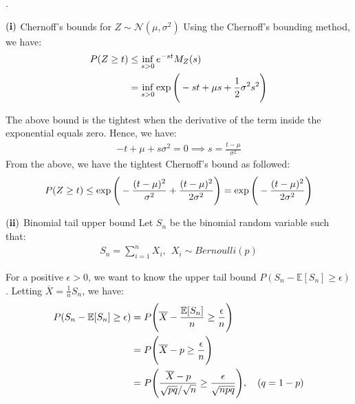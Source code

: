 \begin{solution*}
    .
    \begin{subproof}{$\bf (i)$ Chernoff's bounds for $Z\sim\mathcal{N}(\mu, \sigma^2)$}
        Using the Chernoff's bounding method, we have:
        \begin{align*}
            P(Z\ge t) 
                &\le \inf_{s>0}e^{-st}M_Z(s) \\
                &= \inf_{s>0}\exp\Bigg( 
                    -st + \mu s + \frac{1}{2}\sigma^2 s^2
                 \Bigg) 
        \end{align*}

        \noindent The above bound is the tightest when the derivative of the term inside the exponential equals zero. Hence, we have:
        \begin{align*}
            -t + \mu + s\sigma^2 = 0 \implies s = \frac{t-\mu}{\sigma^2}
        \end{align*}
        \noindent From the above, we have the tightest Chernoff's bound as followed:
        \begin{align*}
            P(Z\ge t) \le \exp\Bigg( 
                -\frac{(t-\mu)^2}{\sigma^2} + \frac{(t-\mu)^2}{2\sigma^2}
             \Bigg) = \exp\Bigg( 
                -\frac{(t-\mu)^2}{2\sigma^2}
             \Bigg)
        \end{align*}
    \end{subproof}

    \begin{subproof}{$\bf (ii)$ Binomial tail upper bound}
        Let $S_n$ be the binomial random variable such that:
        \begin{align*}
            S_n = \sum_{i=1}^n X_i, \ \ X_i \sim Bernoulli(p)
        \end{align*}

        \noindent For a positive $\epsilon > 0$, we want to know the upper tail bound $P(S_n - \mathbb{E}[S_n] \ge\epsilon)$. Letting $\overline{X} = \frac{1}{n}S_n$, we have:
        \begin{align*}
            P(S_n - \mathbb{E}[S_n] \ge\epsilon) 
                &= P\Bigg( 
                    \overline{X} - \frac{\mathbb{E}[S_n]}{n} \ge \frac{\epsilon}{n}
                 \Bigg)  \\
                &= P\Bigg( 
                    \overline{X} - p \ge \frac{\epsilon}{n}
                 \Bigg)  \\
                &= P\Bigg( 
                    \frac{\overline{X} - p}{\sqrt{pq}/\sqrt{n}} \ge \frac{\epsilon}{\sqrt{npq}}
                 \Bigg), \ \ \ (q = 1-p)
        \end{align*}


\end{subproof}
\end{solution*}
